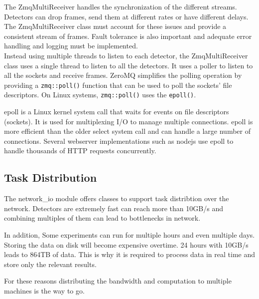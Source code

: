 \documentclass[./chapitre3.tex]{subfiles}
\begin{document}
The ZmqMultiReceiver handles the synchronization of the different streams. Detectors can drop
frames, send them at different rates or have different delays. The ZmqMultiReceiver class
must account for these issues and provide a consistent stream of frames. Fault tolerance is also
important and adequate error handling and logging must be implemented.\\

Instead using multiple threads to listen to each detector, the ZmqMultiReceiver class uses a single
thread to listen to all the detectors. It uses a poller to listen to all the sockets and receive
frames. ZeroMQ simplifies the polling operation by providing a \lstinline|zmq::poll()|
function that can be used to poll the sockets' file descriptors. On Linux systems,
\lstinline|zmq::poll()| uses the \lstinline|epoll()|.

epoll is a Linux kernel system call that waits for events on file descriptors (sockets). It is used for
multiplexing I/O to manage multiple connections. epoll is more efficient than the older select system call
and can handle a large number of connections. Several webserver implementations such as nodejs use epoll to handle
thousands of HTTP requests concurrently. \cite{gammo2004comparing, marathe2015introduction}\\

\subsection{Task Distribution}
The network\_io module offers classes to support task distribtion over the network.
Detectors are extremely fast can reach more than 10GB/s and combining multiples of them
can lead to bottlenecks in network.

In addition, Some experiments
can run for multiple hours and even multiple days. Storing the data on disk will become expensive
overtime. 24 hours with 10GB/s leads to 864TB of data. This is why it is required to
process data in real time and store only the relevant results.

For these reasons distributing the bandwidth and computation to multiple machines
is the way to go.\\
\end{document}
